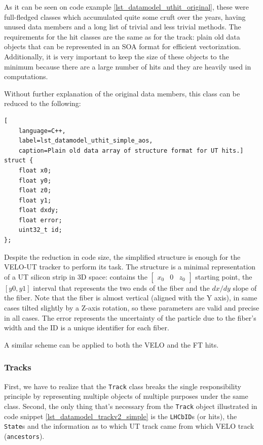 \documentclass[12pt]{article}
\newcommand{\code}[1]{\texttt{#1}}
\begin{document}
As it can be seen on code example \ref{lst_datamodel_uthit_original}, these were full-fledged classes which accumulated quite some cruft over the years, having unused data members and a long list of trivial and less trivial methods. The requirements for the hit classes are the same as for the track: plain old data objects that can be represented in an SOA format for efficient vectorization. Additionally, it is very important to keep the size of these objects to the minimum because there are a large number of hits and they are heavily used in computations.

\vspace{1pc}

Without further explanation of the original data members, this class can be reduced to the following:

\begin{lstlisting}[
	language=C++,
	label=lst_datamodel_uthit_simple_aos,
	caption=Plain old data array of structure format for UT hits.]
struct {
	float x0;
	float y0;
	float z0;
	float y1;
	float dxdy;
	float error;
	uint32_t id;
};
\end{lstlisting}

Despite the reduction in code size, the simplified structure is enough for the VELO-UT tracker to perform its task. The structure is a minimal representation of a UT silicon strip in 3D space: contains the 
$\begin{bmatrix}
	x_0 & 0 & z_0
\end{bmatrix}$
starting point, the $[y0, y1]$ interval that represents the two ends of the fiber and the $dx/dy$ slope of the fiber. Note that the fiber is almost vertical (aligned with the Y axis), in same cases tilted slightly by a Z-axis rotation, so these parameters are valid and precise in all cases. The error represents the uncertainty of the particle due to the fiber's width and the ID is a unique identifier for each fiber.

\vspace{1pc}

A similar scheme can be applied to both the VELO and the FT hits.


\subsubsection{Tracks}

First, we have to realize that the \code{Track} class breaks the single responsibility principle by representing multiple objects of multiple purposes under the same class. Second, the only thing that's necessary from the \code{Track} object illustrated in code snippet \ref{lst_datamodel_trackv2_simple} is the \code{LHCbID}s (or hits), the \code{State}s and the information as to which UT track came from which VELO track (\code{ancestors}).
\end{document}
